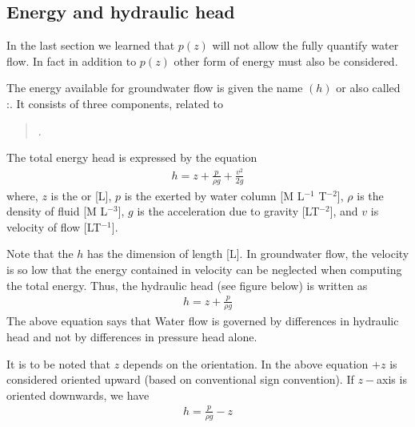 \documentclass[letterpaper,10pt,english]{sphinxmanual}
\begin{document}
\subsection{Energy and hydraulic head}
\label{\detokenize{contents/flow/lecture_04/14_darcy_law_K:energy-and-hydraulic-head}}
In the last section we learned that  \(p(z)\) will not allow the fully quantify water flow. In fact in addition to \(p(z)\) other form of energy must also be considered.

The energy available for groundwater flow is given the name  \((h)\) or also called :. It consists of three components, related to
\begin{quote}

.
\end{quote}

The total energy head is expressed by the equation
\begin{equation*}
\begin{split}
h = z + \frac{p}{\rho g} + \frac{v^2}{2g}
\end{split}
\end{equation*}
where, 
\(z\) is the  or  {[}L{]}, 
\(p\) is the 
exerted by water column {[}M L\(^{-1}\) T\(^{-2}\){]},
\(\rho\) is the density of fluid {[}M L\(^{-3}\){]},
\(g\) is the acceleration due to gravity {[}LT\(^{-2}\){]}, and 
\(v\) is velocity of flow {[}LT\(^{-1}\){]}.

Note that the \(h\) has the dimension of length {[}L{]}.  In groundwater flow, the velocity is so low
that the energy contained in velocity can be neglected when computing the total energy.
Thus, the hydraulic head (see figure below) is written as
\begin{equation*}
\begin{split}
h = z + \frac{p}{\rho g} 
\end{split}
\end{equation*}
The above equation says that Water flow is governed by differences in hydraulic head and not by differences in pressure head alone.

It is to be noted that \(z\) depends on the orientation. In the above equation \(+z\) is considered oriented upward (based on conventional sign convention). If \(z-\)axis is oriented downwards, we have
\begin{equation*}
\begin{split}
h = \frac{p}{\rho g}-z 
\end{split}
\end{equation*}
\end{document}
